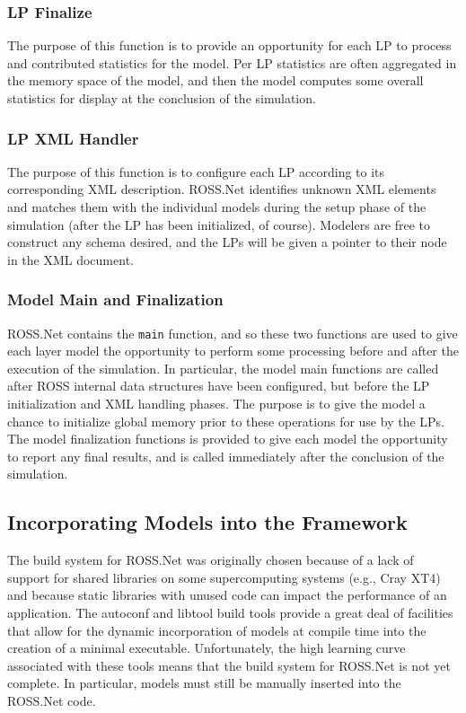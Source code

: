 \documentclass[conference,onecolumn]{IEEEtran}
\begin{document}
\subsubsection{LP Finalize}

The purpose of this function is to provide an opportunity for each LP to process and contributed statistics for the model.  Per LP statistics are often aggregated in the memory space of the model, and then the model computes some overall statistics for display at the conclusion of the simulation.

\subsubsection{LP XML Handler}

The purpose of this function is to configure each LP according to its corresponding XML description.  ROSS.Net identifies unknown XML elements and matches them with the individual models during the setup phase of the simulation (after the LP has been initialized, of course).  Modelers are free to construct any schema desired, and the LPs will be given a pointer to their node in the XML document.

\subsubsection{Model Main and Finalization}

ROSS.Net contains the {\tt main} function, and so these two functions are used to give each layer model the opportunity to perform some processing before and after the execution of the simulation.  In particular, the model main functions are called after ROSS internal data structures have been configured, but before the LP initialization and XML handling phases.  The purpose is to give the model a chance to initialize global memory prior to these operations for use by the LPs.  The model finalization functions is provided to give each model the opportunity to report any final results, and is called immediately after the conclusion of the simulation.

\subsection{Incorporating Models into the Framework}

The build system for ROSS.Net was originally chosen because of a lack of support for shared libraries on some supercomputing systems (e.g., Cray XT4) and because static libraries with unused code can impact the performance of an application.  The autoconf and libtool build tools provide a great deal of facilities that allow for the dynamic incorporation of models at compile time into the creation of a minimal executable.  Unfortunately, the high learning curve associated with these tools means that the build system for ROSS.Net is not yet complete.  In particular, models must still be manually inserted into the ROSS.Net code.
\end{document}
